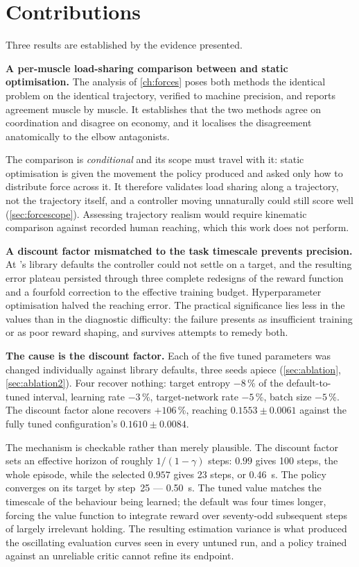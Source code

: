\section{Contributions}

Three results are established by the evidence presented.

\textbf{A per-muscle load-sharing comparison between \DRL and static
optimisation.} The analysis of \cref{ch:forces} poses both methods the identical
problem on the identical trajectory, verified to machine precision, and reports
agreement muscle by muscle. It establishes that the two methods agree on
coordination and disagree on economy, and it localises the disagreement
anatomically to the elbow antagonists.

The comparison is \emph{conditional} and its scope must travel with it: static
optimisation is given the movement the policy produced and asked only how to
distribute force across it. It therefore validates load sharing along a
trajectory, not the trajectory itself, and a controller moving unnaturally could
still score well (\cref{sec:forcescope}). Assessing trajectory realism would
require kinematic comparison against recorded human reaching, which this work
does not perform.

\textbf{A discount factor mismatched to the task timescale prevents precision.} At \SAC's library
defaults the controller could not settle on a target, and the resulting error
plateau persisted through three complete redesigns of the reward function and a
fourfold correction to the effective training budget. Hyperparameter
optimisation halved the reaching error. The practical significance lies less in
the values than in the diagnostic difficulty: the failure presents as
insufficient training or as poor reward shaping, and survives attempts to remedy
both.

\textbf{The cause is the discount factor.} Each of the five tuned parameters was
changed individually against library defaults, three seeds apiece
(\cref{sec:ablation}, \cref{sec:ablation2}). Four recover nothing: target
entropy $-8$\,\% of the default-to-tuned interval, learning rate $-3$\,\%,
target-network rate $-5$\,\%, batch size $-5$\,\%. The discount factor alone
recovers $+106$\,\%, reaching $0.1553 \pm 0.0061$ against the fully tuned
configuration's $0.1610 \pm 0.0084$.

The mechanism is checkable rather than merely plausible. The discount factor sets
an effective horizon of roughly $1/(1-\gamma)$ steps: $0.99$ gives 100 steps, the
whole episode, while the selected $0.957$ gives 23 steps, or \SI{0.46}{\second}.
The policy converges on its target by step~25 --- \SI{0.50}{\second}. The tuned
value matches the timescale of the behaviour being learned; the default was four
times longer, forcing the value function to integrate reward over seventy-odd
subsequent steps of largely irrelevant holding. The resulting estimation variance
is what produced the oscillating evaluation curves seen in every untuned run, and
a policy trained against an unreliable critic cannot refine its endpoint.


